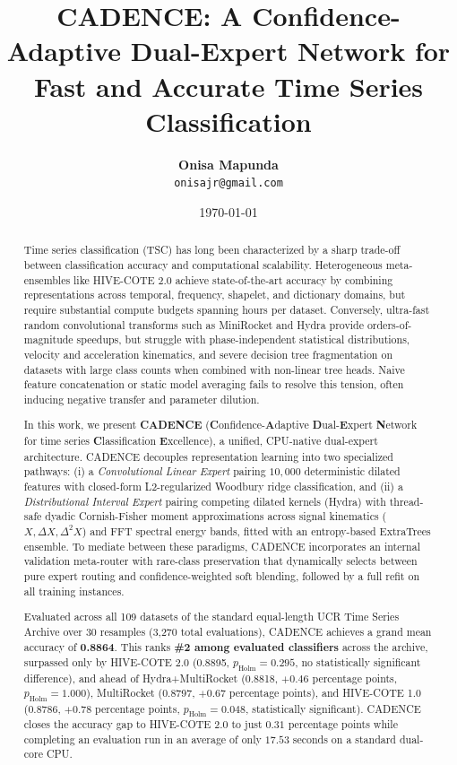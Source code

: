 \documentclass[journal,twocolumn]{article}
\title{\textbf{CADENCE: A Confidence-Adaptive Dual-Expert Network for Fast and Accurate Time Series Classification}}
\author{
    \textbf{Onisa Mapunda}\\
    \texttt{onisajr@gmail.com}
}
\date{\today}
\begin{document}
\maketitle

\begin{abstract}
Time series classification (TSC) has long been characterized by a sharp trade-off between classification accuracy and computational scalability. Heterogeneous meta-ensembles like HIVE-COTE 2.0 achieve state-of-the-art accuracy by combining representations across temporal, frequency, shapelet, and dictionary domains, but require substantial compute budgets spanning hours per dataset. Conversely, ultra-fast random convolutional transforms such as MiniRocket and Hydra provide orders-of-magnitude speedups, but struggle with phase-independent statistical distributions, velocity and acceleration kinematics, and severe decision tree fragmentation on datasets with large class counts when combined with non-linear tree heads. Naive feature concatenation or static model averaging fails to resolve this tension, often inducing negative transfer and parameter dilution.

In this work, we present \textbf{CADENCE} (\textbf{C}onfidence-\textbf{A}daptive \textbf{D}ual-\textbf{E}xpert \textbf{N}etwork for time series \textbf{C}lassification \textbf{E}xcellence), a unified, CPU-native dual-expert architecture. CADENCE decouples representation learning into two specialized pathways: (i) a \textit{Convolutional Linear Expert} pairing $10,000$ deterministic dilated features with closed-form L2-regularized Woodbury ridge classification, and (ii) a \textit{Distributional Interval Expert} pairing competing dilated kernels (Hydra) with thread-safe dyadic Cornish-Fisher moment approximations across signal kinematics ($X, \Delta X, \Delta^2 X$) and FFT spectral energy bands, fitted with an entropy-based ExtraTrees ensemble. To mediate between these paradigms, CADENCE incorporates an internal validation meta-router with rare-class preservation that dynamically selects between pure expert routing and confidence-weighted soft blending, followed by a full refit on all training instances. 

Evaluated across all 109 datasets of the standard equal-length UCR Time Series Archive over 30 resamples (3,270 total evaluations), CADENCE achieves a grand mean accuracy of \textbf{0.8864}. This ranks \textbf{\#2 among evaluated classifiers} across the archive, surpassed only by HIVE-COTE 2.0 (0.8895, $p_{\text{Holm}} = 0.295$, no statistically significant difference), and ahead of Hydra+MultiRocket (0.8818, $+0.46$ percentage points, $p_{\text{Holm}} = 1.000$), MultiRocket (0.8797, $+0.67$ percentage points), and HIVE-COTE 1.0 (0.8786, $+0.78$ percentage points, $p_{\text{Holm}} = 0.048$, statistically significant). CADENCE closes the accuracy gap to HIVE-COTE 2.0 to just $0.31$ percentage points while completing an evaluation run in an average of only $17.53$ seconds on a standard dual-core CPU.
\end{abstract}
\end{document}
